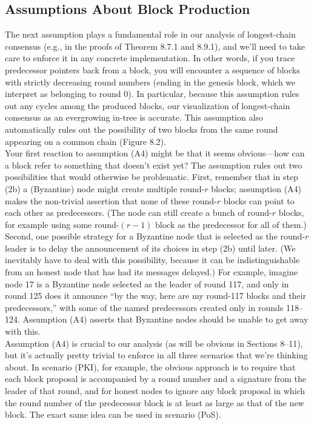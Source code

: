 \subsection{Assumptions About Block Production}
The next assumption plays a fundamental role in our analysis of longest-chain consensus
(e.g., in the proofs of Theorem 8.7.1 and 8.9.1), and we’ll need to take care to enforce it in any
concrete implementation.
In other words, if you trace predecessor pointers back from a block, you will encounter a
sequence of blocks with strictly decreasing round numbers (ending in the genesis block, which
we interpret as belonging to round 0). In particular, because this assumption rules out any
cycles among the produced blocks, our visualization of longest-chain consensus as an evergrowing in-tree is accurate. This assumption also automatically rules out the possibility of
two blocks from the same round appearing on a common chain (Figure 8.2).\\
Your first reaction to assumption (A4) might be that it seems obvious—how can a block
refer to something that doesn't exist yet? The assumption rules out two possibilities that
would otherwise be problematic. First, remember that in step (2b) a (Byzantine) node might
create multiple round-$r$ blocks; assumption (A4) makes the non-trivial assertion that none
of these round-$r$ blocks can point to each other as predecessors. (The node can still create a
bunch of round-$r$ blocks, for example using some round-$(r-1)$ block as the predecessor for all
of them.) Second, one possible strategy for a Byzantine node that is selected as the round-$r$
leader is to delay the announcement of its choices in step (2b) until later. (We inevitably
have to deal with this possibility, because it can be indistinguishable from an honest node
that has had its messages delayed.) For example, imagine node 17 is a Byzantine node
selected as the leader of round 117, and only in round 125 does it announce “by the way,
here are my round-117 blocks and their predecessors,” with some of the named predecessors
created only in rounds 118–124. Assumption (A4) asserts that Byzantine nodes should be
unable to get away with this.\\
Assumption (A4) is crucial to our analysis (as will be obvious in Sections 8–11), but
it’s actually pretty trivial to enforce in all three scenarios that we’re thinking about. In
scenario (PKI), for example, the obvious approach is to require that each block proposal
is accompanied by a round number and a signature from the leader of that round, and for
honest nodes to ignore any block proposal in which the round number of the predecessor
block is at least as large as that of the new block. The exact same idea can be used in
scenario (PoS).\\


